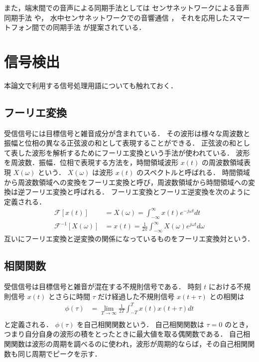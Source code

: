 また，端末間での音声による同期手法としては センサネットワークによる音声同期手法 \cite{SYED, XU} や，
水中センサネットワークでの音響通信 \cite{LU, AKYILDIZ, 浜田龍平}，
それを応用したスマートフォン間での同期手法 \cite{PENG, LAZIK, ENS, JANSON} が提案されている．



\section{信号検出}

本論文で利用する信号処理用語についても触れておく．

\subsection{フーリエ変換}
受信信号には目標信号と雑音成分が含まれている．
その波形は様々な周波数と振幅と位相の異なる正弦波の和として表現することができる．
正弦波の和として表した波形を解析するためにフーリエ変換という手法が使われている．
波形を周波数．振幅．位相で表現する方法を，時間領域波形 $x(t)$ の周波数領域表現 $X(\omega)$ という．
$X(\omega)$ は波形 $x(t)$ のスペクトルと呼ばれる．
時間領域から周波数領域への変換をフーリエ変換と呼び，周波数領域から時間領域への変換は逆フーリエ変換と呼ばれる．
フーリエ変換とフーリエ逆変換を次のように定義される．
$$\begin{aligned}
\mathcal{F}[x(t)] & = X(\omega) = \int^{\infty}_{-\infty} x(t) e^{-j\omega t}dt \\
\mathcal{F}^{-1}[X(\omega)] & = x(t) = \frac{1}{2\pi} \int^{\infty}_{-\infty} X(\omega) e^{j\omega t}d\omega
\end{aligned}$$
互いにフーリエ変換と逆変換の関係になっているものをフーリエ変換対という．

\subsection{相関関数}
受信信号は目標信号と雑音が混在する不規則信号である．
時刻 $t$ における不規則信号 $x(t)$ とさらに時間 $\tau$ だけ経過した不規則信号 $x(t+\tau)$ との相関は
$$\begin{aligned}
\phi(\tau)
&= \lim_{T\to \infty} \frac{1}{2T} \int^{T}_{-T} x(t) x(t+\tau)dt \\
\end{aligned}$$
と定義される．
$\phi(\tau)$ を自己相関関数という．
自己相関関数は $\tau=0$ のとき，つまり自分自身の波形の積をとったときに最大値を取る偶関数である．
自己相関関数は波形の周期を調べるのに使われ，波形が周期的ならば，その自己相関関数も同じ周期でピークを示す．


